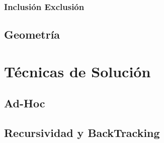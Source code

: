 \documentclass[12pt, fleqn]{report}                             %
\theoremstyle{break}                                            %
\begin{document}
        \section{Inclusión Exclusión}

  
    \clearpage
    \chapter{Geometría}


\part{Técnicas de Solución}

    \clearpage
    \chapter{Ad-Hoc}

    
    \clearpage
    \chapter{Recursividad y BackTracking}

    \clearpage
\end{document}
